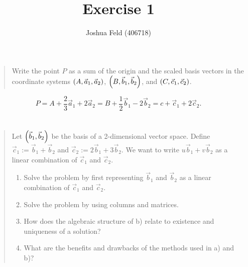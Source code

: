 \documentclass[english]{exercise}
\title{Exercise 1}
\author{Joshua Feld (406718)}
\begin{document}
	\maketitle


	\section{}

	\begin{quote}
		Write the point \(P\) as a sum of the origin and the scaled basis vectors in the coordinate systems \(\parentheses*{A, \vec{a}_1, \vec{a}_2}\), \(\parentheses*{B, \vec{b}_1, \vec{b}_2}\), and \(\parentheses*{C, \vec{c}_1, \vec{c}_2}\).
		\begin{center}
		\end{center}
	\end{quote}

	\[
		P = A + \frac{2}{3}\vec{a}_1 + 2\vec{a}_2 = B + \frac{1}{2}\vec{b}_1 - 2\vec{b}_2 = c + \vec{c}_1 + 2\vec{c}_2.
	\]


	\section{}

	\begin{quote}
		Let \(\parentheses*{\vec{b}_1, \vec{b}_2}\) be the basis of a 2-dimensional vector space.
		Define \(\vec{c}_1 := \vec{b}_1 + \vec{b}_2\) and \(\vec{c}_2 := 2\vec{b}_1 + 3\vec{b}_2\).
		We want to write \(u\vec{b}_1 + v\vec{b}_2\) as a linear combination of \(\vec{c}_1\) and \(\vec{c}_2\).
		\begin{enumerate}
			\item Solve the problem by first representing \(\vec{b}_1\) and \(\vec{b}_2\) as a linear combination of \(\vec{c}_1\) and \(\vec{c}_2\).
			\item Solve the problem by using columns and matrices.
			\item How does the algebraic structure of b) relate to existence and uniqueness of a solution?
			\item What are the benefits and drawbacks of the methods used in a) and b)?
		\end{enumerate}
	\end{quote}
\end{document}
